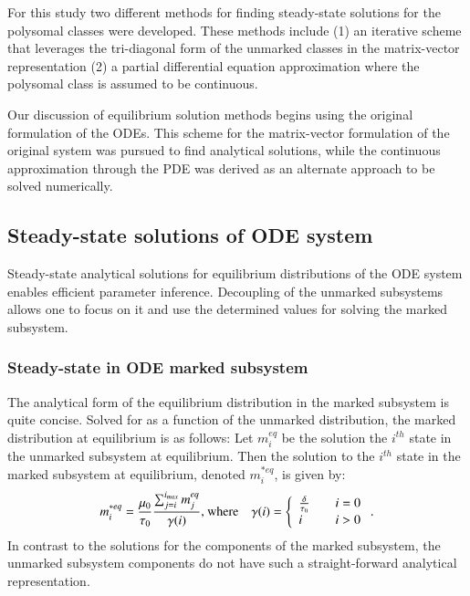 \documentclass[review]{elsarticle}
\begin{document}
For this study two different methods for finding steady-state solutions for the polysomal classes were developed.  These methods include (1) an iterative scheme that leverages the tri-diagonal form of the unmarked classes in the matrix-vector representation (2) a partial differential equation approximation where the polysomal class is assumed to be continuous.  

Our discussion of equilibrium solution methods begins using the original formulation of the ODEs.  This scheme for the matrix-vector formulation of the original system was pursued to find analytical solutions, while the continuous approximation through the PDE was derived as an alternate approach to be solved numerically.  %

\subsection{Steady-state solutions of ODE system}
Steady-state analytical solutions for equilibrium distributions of the ODE system enables efficient parameter inference.  Decoupling of the unmarked subsystems allows one to focus on it and use the determined values for solving the marked subsystem.  
\subsubsection{Steady-state in ODE marked subsystem}
The analytical form of the equilibrium distribution in the marked subsystem is quite concise.  Solved for as a function of the unmarked distribution, the marked distribution at equilibrium is as follows:
Let $m_{i}^{eq}$ be the solution the $i^{th}$ state in the unmarked subsystem at equilibrium.  Then the solution to the $i^{th}$ state in the marked subsystem at equilibrium, denoted $m_{i}^{* eq}$, is given by:
\begin{equation}\label{eq:anyl_marked_eq}
m_{i}^{* eq} = \frac{\mu_0}{\tau_0}\frac{\sum_{j=i}^{i_{max}}m_{j}^{eq}}{\gamma (i)} \text{, where\quad}
\gamma (i) = \left\{
        \begin{array}{ll}
            \frac{\delta}{\tau_0} & \quad i = 0 \\
            i & \quad i > 0
        \end{array}
    \right. .
\end{equation} 
In contrast to the solutions for the components of the marked subsystem, the unmarked subsystem components do not have such a straight-forward analytical representation.
\end{document}
